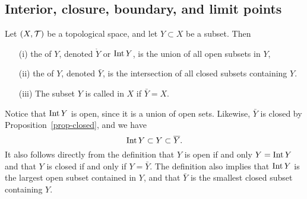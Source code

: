 \subsection{Interior, closure, boundary, and limit points}
\begin{defn}
  Let $(X,\mathcal{T})$ be a topological space, and let $Y \subset X$ be a subset. Then
  \begin{enumerate}
    \item[(i)] the  of $Y$, denoted $\mathring{Y}$ or $\operatorname{Int} Y$, is the union of all open subsets in $Y$,
    \item[(ii)] the  of $Y$, denoted $\bar{Y}$, is the intersection of all closed subsets containing $Y$.
    \item[(iii)] The subset $Y$ is called  in $X$ if $\bar{Y} = X$.
  \end{enumerate}
\end{defn}
Notice that $\operatorname{Int} Y$ is open, since it is a union of open sets. Likewise, $\bar Y$ is closed by Proposition~\ref{prop-closed}, and we have
\[
  \operatorname{Int} Y \subset Y \subset \overline{Y}.
\]
It also follows directly from the definition that $Y$ is open if and only $Y = \operatorname{Int} Y$ and that $Y$ is closed if and only if $Y = \bar Y$. The definition also implies that $\operatorname{Int} Y$ is the largest open subset contained in $Y$, and that $\bar Y$ is the smallest closed subset containing $Y$.

